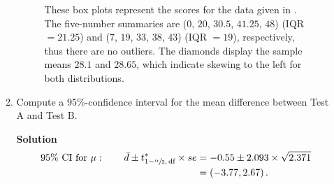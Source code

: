 \begin{enumerate}
\begin{enumerate}
\begin{figure}[h]
\begin{tikzpicture}
            \end{tikzpicture}
            \caption{These box plots represent the scores for the data given in . The five-number summaries are ($0$, $20$, $30.5$, $41.25$, $48$) (IQR $=21.25$) and ($7$, $19$, $33$, $38$, $43$) (IQR $=19$), respectively, thus there are no outliers. The diamonds display the sample means $28.1$ and $28.65$, which indicate skewing to the left for both distributions.}
            \label{fig:hw4q1d}
        \end{figure}
        \FloatBarrier
        \item Compute a 95\%-confidence interval for the mean difference between Test A and Test B.
        \begin{framed}{\textbf{Solution}}
        \begin{align}
            \text{95\% CI for } \mu : \qquad \bar{d} \pm t^*_{1 - \sfrac{\alpha}{2}, \, \text{df}} \times se &= -0.55 \pm 2.093 \times \sqrt{2.371} \\
            &= \brac{-3.77, 2.67}.
        \end{align}
        \end{framed}
    \end{enumerate}
    

\end{enumerate}
